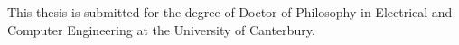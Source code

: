 
This thesis is submitted for the degree of Doctor of Philosophy in Electrical and Computer Engineering at the University of Canterbury. 